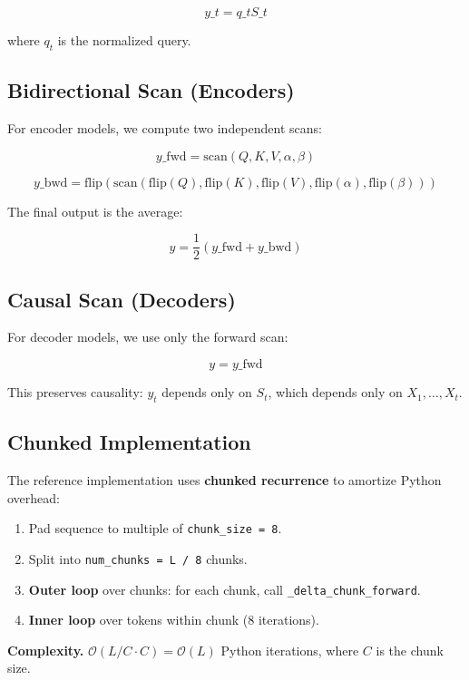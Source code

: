 \[
y\_t = q\_t S\_t
\tag{4.4}
\]

where $q_t$ is the normalized query.

\subsection{Bidirectional Scan (Encoders)}

For encoder models, we compute two independent scans:

\[
y\_\text{fwd} = \text{scan}(Q, K, V, \alpha, \beta)
\tag{4.5}
\]

\[
y\_\text{bwd} = \text{flip}(\text{scan}(\text{flip}(Q), \text{flip}(K), \text{flip}(V), 
\text{flip}(\alpha), \text{flip}(\beta)))
\tag{4.6}
\]

The final output is the average:

\[
y = \frac{1}{2}(y\_\text{fwd} + y\_\text{bwd})
\tag{4.7}
\]

\subsection{Causal Scan (Decoders)}

For decoder models, we use only the forward scan:

\[
y = y\_\text{fwd}
\tag{4.8}
\]

This preserves causality: $y_t$ depends only on $S_t$, which depends only 
on $X_1, \dots, X_t$.

\subsection{Chunked Implementation}

The reference implementation uses \textbf{chunked recurrence} to amortize Python 
overhead:

\begin{enumerate}
\item Pad sequence to multiple of \texttt{chunk\_size = 8}.
\item Split into \texttt{num\_chunks = L / 8} chunks.
\item \textbf{Outer loop} over chunks: for each chunk, call \texttt{\_delta\_chunk\_forward}.
\item \textbf{Inner loop} over tokens within chunk (8 iterations).

\end{enumerate}
\textbf{Complexity.} $\mathcal{O}(L / C \cdot C) = \mathcal{O}(L)$ Python 
iterations, where $C$ is the chunk size.

